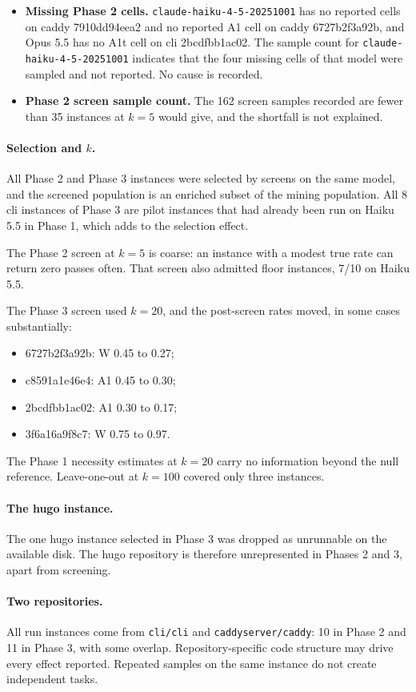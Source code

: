 \begin{itemize}
\item \textbf{Missing Phase 2 cells.} \texttt{claude-haiku-4-5-20251001} has no reported cells on caddy 7910dd94eea2 and no reported A1 cell on caddy 6727b2f3a92b, and Opus 5.5 has no A1t cell on cli 2bcdfbb1ac02. The sample count for \texttt{claude-haiku-4-5-20251001} indicates that the four missing cells of that model were sampled and not reported. No cause is recorded.
\item \textbf{Phase 2 screen sample count.} The 162 screen samples recorded are fewer than 35 instances at $k=5$ would give, and the shortfall is not explained.
\end{itemize}

\paragraph{Selection and $k$.} All Phase 2 and Phase 3 instances were selected by screens on the same model, and the screened population is an enriched subset of the mining population. All 8 cli instances of Phase 3 are pilot instances that had already been run on Haiku 5.5 in Phase 1, which adds to the selection effect.

The Phase 2 screen at $k=5$ is coarse: an instance with a modest true rate can return zero passes often. That screen also admitted floor instances, 7/10 on Haiku 5.5.

The Phase 3 screen used $k=20$, and the post-screen rates moved, in some cases substantially:
\begin{itemize}
\item 6727b2f3a92b: W 0.45 to 0.27;
\item c8591a1e46e4: A1 0.45 to 0.30;
\item 2bcdfbb1ac02: A1 0.30 to 0.17;
\item 3f6a16a9f8c7: W 0.75 to 0.97.
\end{itemize}

The Phase 1 necessity estimates at $k=20$ carry no information beyond the null reference. Leave-one-out at $k=100$ covered only three instances.

\paragraph{The hugo instance.} The one hugo instance selected in Phase 3 was dropped as unrunnable on the available disk. The hugo repository is therefore unrepresented in Phases 2 and 3, apart from screening.

\paragraph{Two repositories.} All run instances come from \texttt{cli/cli} and \texttt{caddyserver/caddy}: 10 in Phase 2 and 11 in Phase 3, with some overlap. Repository-specific code structure may drive every effect reported. Repeated samples on the same instance do not create independent tasks.

